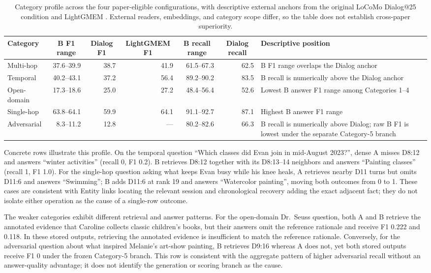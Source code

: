 \documentclass[10pt,twocolumn]{article}
\begin{document}
\begin{table}[t]
\centering
\caption{Category profile across the four paper-eligible configurations, with descriptive
external anchors from the original LoCoMo Dialog@25 condition
\citep{maharana2024locomo} and LightGMEM
\citep{anonymous2026lightgmem}. External readers, embeddings, and category
scope differ, so the table does not establish cross-paper superiority.}
\label{tab:categories}
\begin{tabularx}{\textwidth}{@{}lrrrrrX@{}}
\toprule
Category & \multicolumn{1}{c}{B F1 range} & \multicolumn{1}{c}{Dialog F1} &
\multicolumn{1}{c}{LightGMEM F1} & \multicolumn{1}{c}{B recall range} &
\multicolumn{1}{c}{Dialog recall} & Descriptive position \\
\midrule
Multi-hop & 37.6--39.9 & 38.7 & 41.9 & 61.5--67.3 & 62.5 & B F1 range overlaps the Dialog anchor \\
Temporal & 40.2--43.1 & 37.2 & 56.4 & 89.2--90.2 & 83.5 & B recall is numerically above the Dialog anchor \\
Open-domain & 17.3--18.6 & 25.0 & 27.2 & 48.4--56.4 & 52.6 & Lowest B answer F1 range among Categories 1--4 \\
Single-hop & 63.8--64.1 & 59.9 & 64.1 & 91.1--92.7 & 87.1 & Highest B answer F1 range \\
Adversarial & 8.3--11.2 & 12.8 & --- & 80.2--82.6 & 66.3 & B recall is numerically above Dialog; raw B F1 is lowest under the separate Category-5 branch \\
\bottomrule
\end{tabularx}
\end{table}

Concrete rows illustrate this profile. On the temporal question ``Which classes
did Evan join in mid-August 2023?'', dense A misses D8:12 and answers
``winter activities'' (recall 0, F1 0.2). B retrieves D8:12 together with its
D8:13--14 neighbors and answers ``Painting classes'' (recall 1, F1 1.0).
For the single-hop question asking what keeps Evan busy while his knee heals,
A retrieves nearby D11 turns but omits D11:6 and answers ``Swimming''; B adds
D11:6 at rank 19 and answers ``Watercolor painting'', moving both outcomes
from 0 to 1. These cases are consistent with Entity links locating the
relevant session and chronological recovery adding the exact adjacent fact;
they do not isolate either operation as the cause of a single-row outcome.

The weaker categories exhibit different retrieval and answer patterns. For the open-domain
Dr.~Seuss question, both A and B retrieve the annotated evidence that Caroline
collects classic children's books, but their answers omit the reference
rationale and receive F1 0.222 and 0.118. In these stored outputs, retrieving
the annotated evidence is insufficient to match the reference rationale.
Conversely, for the adversarial question about
what inspired Melanie's art-show painting, B retrieves D9:16 whereas A does
not, yet both stored outputs receive F1 0 under the frozen Category-5 branch.
This row is consistent with the aggregate pattern of higher adversarial
recall without an answer-quality advantage; it does not identify the
generation or scoring branch as the cause.
\end{document}
